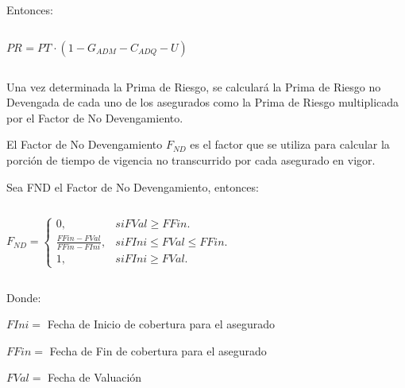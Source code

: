 \documentclass[11pt,twoside,openright,spanish]{report}
\numberwithin{equation}{chapter}
\numberwithin{figure}{chapter}
\numberwithin{table}{chapter}
\begin{document}
	\doublespacing

$ $

\doublespacing
	
	Entonces:
	
	\doublespacing

$ $

\doublespacing
	
		{\centering
		${PR}_{}^{}={{PT}_{}\cdot(1-G_{ADM}-C_{ADQ}-U)}$
		\noindent
		
	}	
	
	
	\doublespacing

$ $

\doublespacing
	
	Una vez determinada la Prima de Riesgo, se calculará la Prima de Riesgo no Devengada de cada uno de los asegurados como la Prima de Riesgo multiplicada por el Factor de No Devengamiento.
	
	\doublespacing
	
	El Factor de No Devengamiento $F_{ND}$ es el factor que se utiliza para calcular la porción de tiempo de vigencia no transcurrido por cada asegurado en vigor.
	
	\doublespacing
	
	Sea FND el Factor de No Devengamiento, entonces:
	
	\doublespacing

$ $

\doublespacing
	
		{\centering	
		
		$
		F_{ND}=\begin{cases}
		0, & \text{$si FVal \geqslant FFin$}.\\
		\frac{{FFin}^{}-{FVal}^{}}{{FFin}^{}-{FIni}^{}}, & \text{$si FIni \leqslant FVal \leqslant FFin$}.\\
		1, & \text{$si FIni \geqslant FVal$}.
		\end{cases}
		$
		
		\noindent
		
	}
	
	\doublespacing

$ $

\doublespacing
	
	Donde:
	
	\doublespacing
	
	 $FIni=$ Fecha de Inicio de cobertura para el asegurado
	
	$FFin=$ Fecha de Fin de cobertura para el asegurado
	
	$FVal=$ Fecha de Valuación
	
\end{document}
